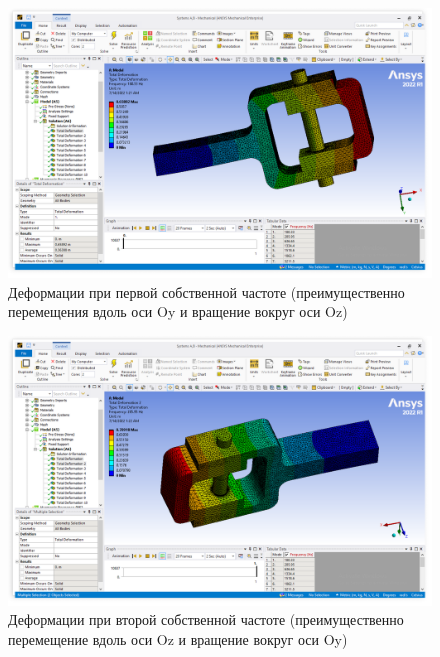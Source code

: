 \begin{figure}[H] 
	\center
	\includegraphics[width=\textwidth]{images/mod1.png}
	\caption{Деформации при первой собственной частоте (преимущественно перемещения вдоль оси Oy и вращение вокруг оси Oz)}
	\label{fig:mod1}
\end{figure}

\begin{figure}[H] 
	\center
	\includegraphics[width=\textwidth]{images/mod2.png}
	\caption{Деформации при второй собственной частоте (преимущественно перемещение вдоль оси Oz и вращение вокруг оси Oy)}
	\label{fig:mod2}
\end{figure}


